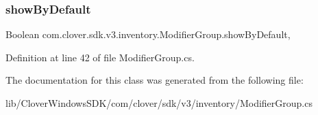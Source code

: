 \mbox{\label{classcom_1_1clover_1_1sdk_1_1v3_1_1inventory_1_1_modifier_group_a1ecb30928853e5d1f69ac28435d441b8}} 
\subsubsection{\texorpdfstring{show\+By\+Default}{showByDefault}}
{\footnotesize\ttfamily Boolean com.\+clover.\+sdk.\+v3.\+inventory.\+Modifier\+Group.\+show\+By\+Default\hspace{0.3cm}{\ttfamily [get]}, {\ttfamily [set]}}



Definition at line 42 of file Modifier\+Group.\+cs.



The documentation for this class was generated from the following file\+:\begin{DoxyCompactItemize}
\item 
lib/\+Clover\+Windows\+S\+D\+K/com/clover/sdk/v3/inventory/Modifier\+Group.\+cs\end{DoxyCompactItemize}
